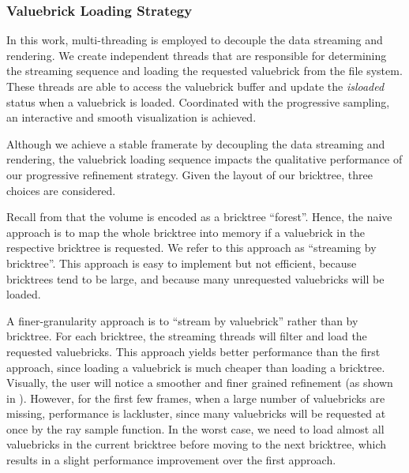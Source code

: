 \subsubsection{Valuebrick Loading Strategy}
In this work, multi-threading is employed to decouple the data streaming and rendering. 
We create independent threads that are responsible for determining the streaming sequence
and loading the requested valuebrick from the file system. These threads are able to access
the valuebrick buffer and update the \textit{isloaded} status when a valuebrick is loaded. 
Coordinated with the progressive sampling, an interactive and smooth visualization is achieved.

Although we achieve a stable framerate by decoupling the data streaming and rendering, the 
valuebrick loading sequence impacts the qualitative performance of our 
progressive refinement strategy. Given the layout of our bricktree, three choices are considered.

Recall from  that the volume is encoded as a bricktree ``forest''. 
Hence, the naive approach is to map the whole bricktree into memory if a valuebrick in the
respective bricktree is requested. We refer to this approach as ``streaming by bricktree''. 
This approach is easy to implement but not efficient, because bricktrees tend to be large, 
and because many unrequested valuebricks will be loaded. 



A finer-granularity approach is to ``stream by valuebrick'' rather than by bricktree. For each
bricktree, the streaming threads will filter and load the requested valuebricks. 
This approach yields better performance than the first approach, since loading a valuebrick
is much cheaper than loading a bricktree. Visually, the user will notice a smoother and finer grained refinement (as shown in ).
However, for the first few frames, when a large number of valuebricks are missing, performance is lackluster, since many valuebricks will be requested at once by the ray sample function.
In the worst case, we need to load almost all valuebricks
in the current bricktree before moving to the next bricktree, which results in a slight performance improvement over the first approach.



